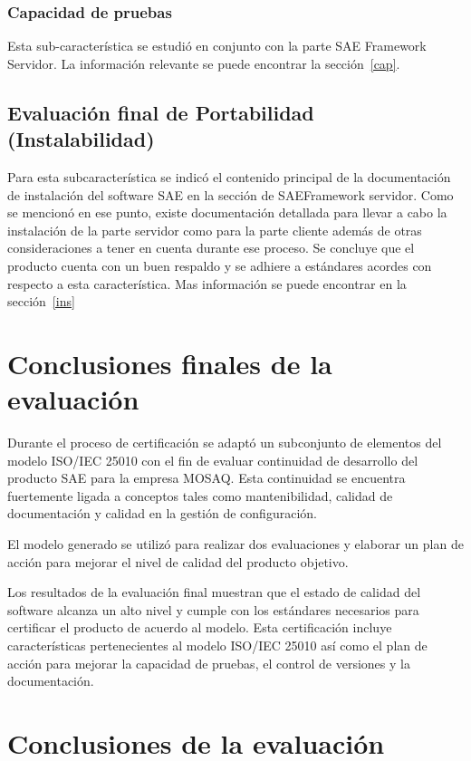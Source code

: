 \subsubsection{Capacidad de pruebas}

Esta sub-característica se estudió en conjunto con la parte SAE Framework 
Servidor. La información relevante se puede encontrar la sección~\ref{cap}.

\subsection{Evaluación final de Portabilidad (Instalabilidad)}

Para esta subcaracterística se indicó el contenido principal de la documentación de instalación
del software SAE en la sección de SAEFramework servidor. Como se mencionó en ese punto, existe
documentación detallada para llevar a cabo la instalación de la parte 
servidor como para la parte cliente además de otras consideraciones a tener en cuenta durante ese proceso.
Se concluye que el producto cuenta con un buen respaldo y se adhiere 
a estándares acordes con respecto a esta característica. Mas información se puede encontrar en la sección~\ref{ins}

\section{Conclusiones finales de la evaluación}
Durante el proceso de certificación se adaptó un subconjunto de
elementos del modelo ISO/IEC 25010 con el fin de evaluar continuidad de 
desarrollo del producto SAE para la empresa MOSAQ.
Esta continuidad se encuentra fuertemente ligada a conceptos tales como 
mantenibilidad, calidad de documentación y calidad en la gestión de configuración.

El modelo generado se utilizó para realizar dos evaluaciones y elaborar un plan de acción para mejorar el nivel de calidad del producto objetivo.

Los resultados de la evaluación final muestran que el estado de calidad del 
software alcanza un alto nivel y cumple con los estándares necesarios para 
certificar el producto de acuerdo al modelo. Esta certificación incluye 
características pertenecientes al modelo ISO/IEC 25010 así como el plan de 
acción para mejorar la capacidad de pruebas, el control de versiones y la documentación.

\section{Conclusiones de la evaluación}
